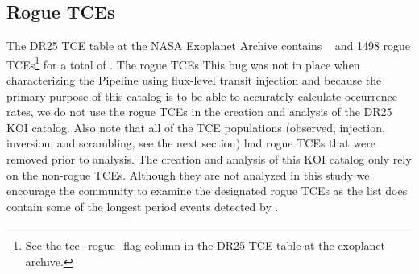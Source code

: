 \subsection{Rogue TCEs}
The DR25 TCE table at the NASA Exoplanet Archive contains \ntcesnorogue\  and 1498 rogue TCEs\footnote{See the tce\_rogue\_flag column in the DR25 TCE table at the exoplanet archive.} for a total of \ntces. The rogue TCEs   This bug was not in place when characterizing the Pipeline using flux-level transit injection \citep[see][]{Burke2017a,Burke2017b} and because the primary purpose of this catalog is to be able to accurately calculate occurrence rates, we do not use the rogue TCEs in the creation and analysis of the DR25 KOI catalog. Also note that all of the TCE populations (observed, injection, inversion, and scrambling, see the next section) had rogue TCEs that were removed prior to analysis. The creation and analysis of this KOI catalog only rely on the non-rogue TCEs. Although they are not analyzed in this study we encourage the community to examine the designated rogue TCEs as the list does contain some of the longest period events detected by \Kepler.

